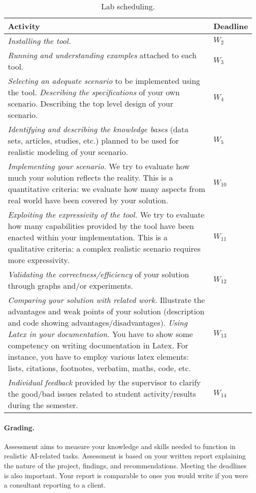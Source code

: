 \begin{table}
\begin{center}
\caption{Lab scheduling.}
\begin{tabular}{|p{11cm}|p{1.7cm}|}\hline
\textbf{Activity} & \textbf{Deadline}  \\ \hline
{\it Installing the tool.}  & $W_2$ \\ \hline
{\it Running and understanding examples} attached to each tool.& $W_3$  \\ \hline
{\it Selecting an adequate scenario} to be implemented using the tool. 
{\it Describing the specifications} of your own scenario. 
Describing the top level design of your scenario. & $W_4$  \\ \hline
{\it Identifying and describing the knowledge bases} (data sets, articles, studies, etc.) planned to be used for realistic modeling of your scenario. & $W_5$ \\ \hline
{\it Implementing your scenario.} We try to evaluate how much your solution reflects the reality. 
This is a quantitative criteria: 
we evaluate how many aspects from real world have been covered by your solution. & $W_{10}$ \\ \hline
{\it Exploiting the expressivity of the tool.} 
We try to evaluate how many capabilities provided by the tool have been enacted within your implementation. 
This is a qualitative criteria: a complex realistic scenario requires more expressivity. & $W_{11}$ \\ \hline
{\it Validating the correctness/efficiency} of your solution through graphs and/or experiments. & $W_{12}$  \\ \hline
{\it Comparing your solution with related work.} Illustrate the advantages and weak points of your solution (description and code showing advantages/disadvantages).  
{\it Using Latex in your documentation.} You have to show some competency on writing documentation in Latex. 
For instance, you have to employ various latex elements: lists, citations, footnotes, verbatim, maths, code, etc. & $W_{13}$ \\ \hline
{\it Individual feedback} provided by the supervisor to clarify the good/bad issues related to student activity/results during the semester. & $W_{14}$ \\ \hline 
\end{tabular}
\end{center}
\label{tab:first}
\end{table}

\paragraph{Grading.}
Assessment aims to measure your knowledge and skills needed to function in realistic AI-related tasks.
Assessment is based on your written report explaining the nature of the project, findings, and recommendations. 
Meeting the deadlines is also important.
Your report is comparable to ones you would write if you were a consultant reporting to a client.

